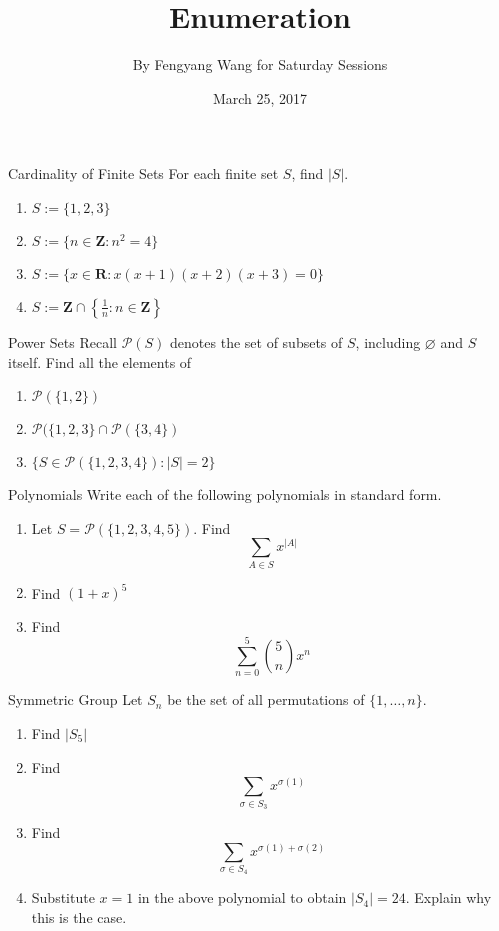 \documentclass[12pt,letterpaper]{article}
\title{Enumeration}
\author{By Fengyang Wang for Saturday Sessions}
\date{March 25, 2017}
\begin{document}
\HomeworkTitle
\begin{problem}{Cardinality of Finite Sets}
  For each finite set \(S\), find \(|S|\).

  \begin{enumerate}
    \item \(S := \{1, 2, 3\}\)
    \item \(S := \{n \in \mathbf{Z} : n^2 = 4\}\)
    \item \(S := \{x \in \mathbf{R} : x(x+1)(x+2)(x+3) = 0\}\)
    \item \(S := \mathbf{Z} \cap \left\{\frac{1}{n} : n \in \mathbf{Z}\right\}\)
  \end{enumerate}
\end{problem}

\begin{problem}{Power Sets}
  Recall \(\mathcal{P}(S)\) denotes the set of subsets of \(S\), including
  \(\varnothing\) and \(S\) itself. Find all the elements of

  \begin{enumerate}
    \item \(\mathcal{P}(\{1, 2\})\)
    \item \(\mathcal{P}(\{1, 2, 3\} \cap \mathcal{P}(\{3, 4\})\)
    \item \(\{S \in \mathcal{P}(\{1, 2, 3, 4\}) : |S| = 2\}\)
  \end{enumerate}
\end{problem}

\begin{problem}{Polynomials}
  Write each of the following polynomials in standard form.

  \begin{enumerate}
    \item Let \(S = \mathcal{P}(\{1, 2, 3, 4, 5\})\). Find \[
      \sum_{A\in S} x^{|A|}
    \]
    \item Find \((1+x)^5\)
    \item Find \[
      \sum_{n=0}^5 \binom{5}{n} x^n
    \]
  \end{enumerate}
\end{problem}

\begin{problem}{Symmetric Group}
  Let \(S_n\) be the set of all permutations of \(\{1, \dots, n\}\).

  \begin{enumerate}
    \item Find \(|S_5|\)
    \item Find \[
      \sum_{\sigma\in S_3} x^{\sigma(1)}
    \]
    \item Find \[
      \sum_{\sigma\in S_4} x^{\sigma(1) + \sigma(2)}
    \]
    \item Substitute \(x=1\) in the above polynomial to obtain \(|S_4| = 24\).
    Explain why this is the case.
  \end{enumerate}
\end{problem}
\end{document}
